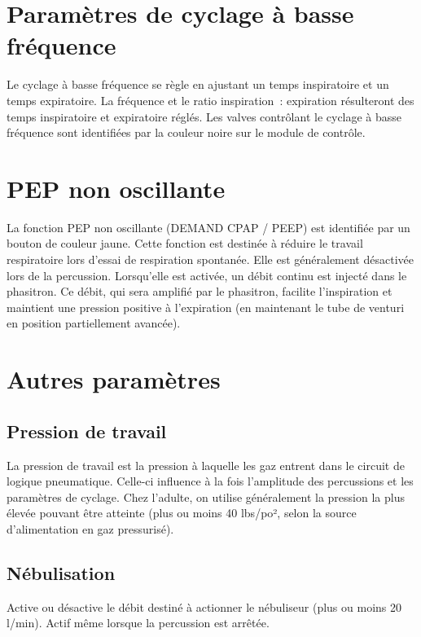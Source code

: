 \section{Paramètres de cyclage à basse fréquence}

Le cyclage à basse fréquence se règle en ajustant un temps inspiratoire et un
temps expiratoire.  La fréquence et le ratio inspiration : expiration
résulteront des temps inspiratoire et expiratoire réglés. Les valves contrôlant
le cyclage à basse fréquence sont identifiées par la couleur noire sur le
module de contrôle.

\section{PEP non oscillante}

La fonction PEP non oscillante (DEMAND CPAP / PEEP) est identifiée par un
bouton de couleur jaune.  Cette fonction est destinée à réduire le travail
respiratoire lors d’essai de respiration spontanée. Elle est généralement
désactivée lors de la percussion. Lorsqu’elle est activée, un débit continu est
injecté dans le phasitron. Ce débit, qui sera amplifié par le phasitron,
facilite l’inspiration et maintient une pression positive à l’expiration (en
maintenant le tube de venturi en position partiellement avancée).  

\section{Autres paramètres}

\subsection{Pression de travail}

La pression de travail est la pression à laquelle les gaz entrent dans le
circuit de logique pneumatique. Celle-ci influence à la fois l’amplitude des
percussions et les paramètres de cyclage. Chez l’adulte, on utilise
généralement la pression la plus élevée pouvant être atteinte (plus ou moins 40
lbs/po², selon la source d’alimentation en gaz pressurisé).


\subsection{Nébulisation}

Active ou désactive le débit destiné à actionner le nébuliseur (plus ou moins
20 l/min). Actif même lorsque la percussion est arrêtée. 

